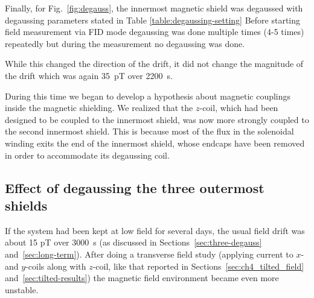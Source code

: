 Finally, for Fig.~\ref{fig:degauss}, the innermost
magnetic shield was degaussed  with degaussing parameters stated in Table \ref{table:degaussing-setting}
Before starting field measurement via FID mode degaussing was done multiple times (4-5 times) repeatedly but during the measurement no degaussing was done. 
  
While this changed the direction of the drift, it did not change the
magnitude of the drift which was again 35~pT over 2200~s.


During this time we began to develop a hypothesis about magnetic
couplings inside the magnetic shielding.  We realized that the
$z$-coil, which had been designed to be coupled to the innermost
shield, was now more strongly coupled to the second innermost shield.
This is because most of the flux in the solenoidal winding exits the
end of the innermost shield, whose endcaps have been removed in order
to accommodate its degaussing coil.


\subsection{Effect of degaussing the three outermost shields\label{sec:outermosts-shield-degauss}}
 
If the system had been kept at low field for several days, the usual
field drift was about 15 pT over 3000~s (as discussed in
Sections~\ref{sec:three-degauss} and~\ref{sec:long-term}).  After
doing a transverse field study (applying current to $x$- and $y$-coils
along with $z$-coil, like that reported in
Sections~\ref{sec:ch4_tilted_field} and~\ref{sec:tilted-results}) the
magnetic field environment became even more unstable.

